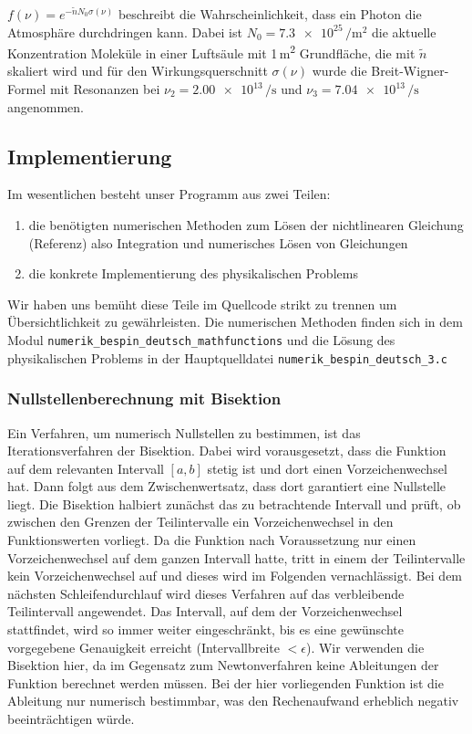 \documentclass[10pt,a4paper]{article}
\begin{document}
$f(\nu) = e^{-\tilde{n} N_0 \sigma(\nu)}$ beschreibt die Wahrscheinlichkeit, dass ein Photon die Atmosphäre durchdringen kann. Dabei ist $N_0 = \num{7.3e25}\,\si{\per\metre^2}$ die aktuelle Konzentration  Moleküle in einer Luftsäule mit 1\,\si{\metre^2} Grundfläche, die mit $\tilde{n}$ skaliert wird und für den Wirkungsquerschnitt $\sigma(\nu)$ wurde die Breit-Wigner-Formel mit Resonanzen bei $\nu_2 = \num{2.00e13}\, \si{\per\second}$ und $\nu_3 = \num{7.04e13}\, \si{\per\second}$ angenommen.

\subsection{Implementierung}
Im wesentlichen besteht unser Programm aus zwei Teilen:
\begin{enumerate}
	\item die benötigten numerischen Methoden zum Lösen der nichtlinearen Gleichung (Referenz) also Integration und numerisches Lösen von Gleichungen
	\item die konkrete Implementierung des physikalischen Problems
\end{enumerate}
Wir haben uns bemüht diese Teile im Quellcode strikt zu trennen um Übersichtlichkeit zu gewährleisten.
Die numerischen Methoden finden sich in dem Modul \texttt{numerik\_bespin\_deutsch\_mathfunctions} und die Lösung des physikalischen Problems in der Hauptquelldatei \texttt{numerik\_bespin\_deutsch\_3.c}

\subsubsection{Nullstellenberechnung mit Bisektion}

Ein Verfahren, um numerisch Nullstellen zu bestimmen, ist das Iterationsverfahren der Bisektion. Dabei wird vorausgesetzt, dass die Funktion auf dem relevanten Intervall $[a,b]$ stetig ist und dort einen Vorzeichenwechsel hat. Dann folgt aus dem Zwischenwertsatz, dass dort garantiert eine Nullstelle liegt. Die Bisektion halbiert zunächst das zu betrachtende Intervall und prüft, ob zwischen den Grenzen der Teilintervalle ein Vorzeichenwechsel in den Funktionswerten vorliegt. Da die Funktion nach Voraussetzung nur einen Vorzeichenwechsel auf dem ganzen Intervall hatte, tritt in einem der Teilintervalle kein Vorzeichenwechsel auf und dieses wird im Folgenden vernachlässigt. Bei dem nächsten Schleifendurchlauf wird dieses Verfahren auf das verbleibende Teilintervall angewendet. Das Intervall, auf dem der Vorzeichenwechsel stattfindet, wird so immer weiter eingeschränkt, bis es eine gewünschte vorgegebene Genauigkeit erreicht (Intervallbreite $<\epsilon$). 
Wir verwenden die Bisektion hier, da im Gegensatz zum Newtonverfahren keine Ableitungen der Funktion  berechnet werden müssen. Bei der hier vorliegenden Funktion ist die Ableitung nur numerisch bestimmbar, was den Rechenaufwand erheblich negativ beeinträchtigen würde.
\end{document}
